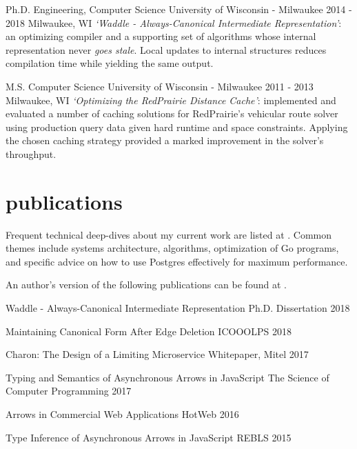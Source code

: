 \documentclass[]{clean-resume}
\begin{document}
\entry
  {Ph.D. Engineering, Computer Science}
  {University of Wisconsin - Milwaukee}
  {2014 - 2018}
  {Milwaukee, WI}
  {
    \emph{`Waddle - Always-Canonical Intermediate Representation'}: an optimizing compiler and a supporting set of algorithms whose internal representation never \emph{goes stale}. Local updates to internal structures reduces compilation time while yielding the same output.
  }

\entry
  {M.S. Computer Science}
  {University of Wisconsin - Milwaukee}
  {2011 - 2013}
  {Milwaukee, WI}
  {
    \emph{`Optimizing the RedPrairie Distance Cache'}: implemented and evaluated a number of caching solutions for RedPrairie's vehicular route solver using production query data given hard runtime and space constraints. Applying the chosen caching strategy provided a marked improvement in the solver's throughput.
  }

\section{publications}

Frequent technical deep-dives about my current work are listed at \articeslink. Common themes include systems architecture, algorithms, optimization of Go programs, and specific advice on how to use Postgres effectively for maximum performance.

An author's version of the following publications can be found at \paperslink.

\shortentry
  {Waddle - Always-Canonical Intermediate Representation}
  {Ph.D. Dissertation}
  {2018}

\shortentry
  {Maintaining Canonical Form After Edge Deletion}
  {ICOOOLPS}
  {2018}

\shortentry
  {Charon: The Design of a Limiting Microservice}
  {Whitepaper, Mitel}
  {2017}

\shortentry
  {Typing and Semantics of Asynchronous Arrows in JavaScript}
  {The Science of Computer Programming}
  {2017}

\shortentry
  {Arrows in Commercial Web Applications}
  {HotWeb}
  {2016}

\shortentry
  {Type Inference of Asynchronous Arrows in JavaScript}
  {REBLS}
  {2015}
\end{document}
